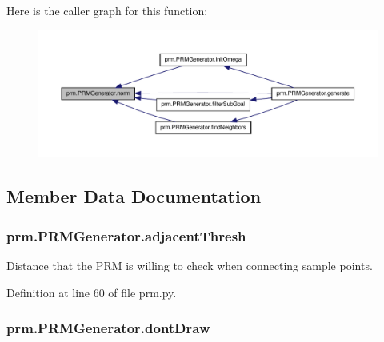 Here is the caller graph for this function\-:
\nopagebreak
\begin{figure}[H]
\begin{center}
\leavevmode
\includegraphics[width=350pt]{classprm_1_1PRMGenerator_a652b3c0fa11645f351c23635d7e62dda_icgraph}
\end{center}
\end{figure}




\subsection{Member Data Documentation}
\hypertarget{classprm_1_1PRMGenerator_aa56ad4365534ffed0b4311c5accce577}{
\subsubsection[{adjacent\-Thresh}]{\setlength{\rightskip}{0pt plus 5cm}prm.\-P\-R\-M\-Generator.\-adjacent\-Thresh}}\label{classprm_1_1PRMGenerator_aa56ad4365534ffed0b4311c5accce577}


Distance that the P\-R\-M is willing to check when connecting sample points. 



Definition at line 60 of file prm.\-py.

\hypertarget{classprm_1_1PRMGenerator_a6a92750aa0e081cc87c64e157b0ecb53}{
\subsubsection[{dont\-Draw}]{\setlength{\rightskip}{0pt plus 5cm}prm.\-P\-R\-M\-Generator.\-dont\-Draw}}\label{classprm_1_1PRMGenerator_a6a92750aa0e081cc87c64e157b0ecb53}


